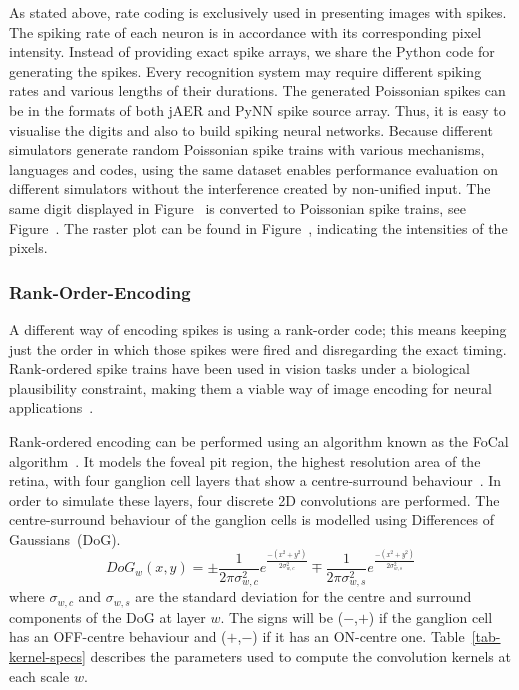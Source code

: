 \documentclass{frontiersENG} %
\begin{document}
As stated above, rate coding is exclusively used in presenting images with spikes.
The spiking rate of each neuron is in accordance with its corresponding pixel intensity.
Instead of providing exact spike arrays, we share the Python code for generating the spikes.
Every recognition system may require different spiking rates and various lengths of their durations.
The generated Poissonian spikes can be in the formats of both jAER and PyNN spike source array.
Thus, it is easy to visualise the digits and also to build spiking neural networks.
Because different simulators generate random Poissonian spike trains with various mechanisms, languages and codes, using the same dataset enables performance evaluation on different simulators without the interference created by non-unified input.
The same digit displayed in Figure~ is converted to Poissonian spike trains, see Figure~.
The raster plot can be found in Figure~, indicating the intensities of the pixels.



\subsubsection{Rank-Order-Encoding}
A different way of encoding spikes is using a rank-order code; this means
keeping just the order in which those spikes were fired and disregarding the exact timing. Rank-ordered spike trains have been used in vision tasks under a biological plausibility constraint, making them a viable way of image encoding for neural applications~\citep{van2001rate,sen2009evaluating,masmoudi2010novel}.

Rank-ordered encoding can be performed using an algorithm known as the
{FoCal algorithm~\citep{sen2009evaluating}}.
It models the foveal pit region, the highest resolution area of the retina, with four ganglion cell layers that show a centre-surround behaviour~\citep{kolb2003retina}. In order to simulate these layers, four discrete 2D convolutions are performed. The centre-surround behaviour of the ganglion cells is modelled using Differences of Gaussians~(DoG). 
\begin{equation}
\label{eq-dog}
DoG_w(x,y) = \pm\frac{1}{2\pi\sigma_{w,c}^2}e^{\frac{-(x^2 + y^2)}{2\sigma_{w,c}^2}}
\mp\frac{1}{2\pi\sigma_{w,s}^2}e^{\frac{-(x^2 + y^2)}{2\sigma_{w,s}^2}}
\end{equation}
where $\sigma_{w,c}$ and $\sigma_{w,s}$ are the standard deviation for the 
centre and surround components of the DoG at layer $w$. The signs 
will be ($-$,$+$) if the ganglion cell has an OFF-centre behaviour and 
($+$,$-$) if it has an ON-centre one. Table~\ref{tab-kernel-specs} 
describes the parameters used to compute the convolution kernels at each 
scale $w$.
\end{document}
